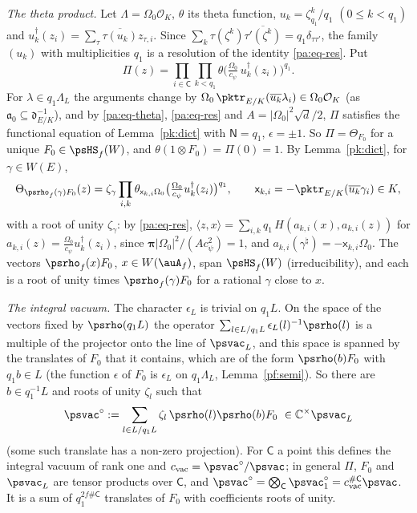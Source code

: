 \documentclass[10pt]{amsart}
\theoremstyle{definition}
\theoremstyle{remark}
\newcommand{\C}{\mathbb C}
\providecommand{\auO}{\mathcal O}
\providecommand{\aubar}[1]{\overline{#1}}
\begin{document}
\emph{The theta product.} Let $\Lambda=\Omega_0\auO_K$, $\theta$ its theta function, $u_k=
\zeta_{q_1}^k/q_1$ $(0\le k<q_1)$ and $u_k^\dagger(z_i)=\sum_\tau\aubar{\tau(u_k)}z_{\tau,i}$. Since
$\sum_k\tau(\zeta^k)\aubar{\tau'(\zeta^k)}=q_1\delta_{\tau\tau'}$, the family $(u_k)$ with
multiplicities $q_1$ is a resolution of the identity \eqref{pa:eq-res}. Put
\begin{equation}\label{pk:eq-product}
\Pi(z)=\prod_{i\in\mathsf C}\prod_{k<q_1}\theta\bigl(\tfrac{\Omega_0}{c_\psi}\,u_k^\dagger(z_i)\bigr)^{q_1}.
\end{equation}
For $\lambda\in q_1\Lambda_L$ the arguments change by $\Omega_0\,\pktr_{E/K}(\aubar{u_k}\lambda_i)\in
\Omega_0\auO_K$ (as $\mathfrak a_0\subseteq\mathfrak d_{E/K}^{-1}$), and by \eqref{pa:eq-theta},
\eqref{pa:eq-res} and $A=|\Omega_0|^2\sqrt d/2$, $\Pi$ satisfies the functional equation of
Lemma~\ref{pk:dict} with $\mathsf N=q_1$, $\epsilon=\pm1$. So $\Pi=\Theta_{F_0}$ for a unique
$F_0\in\psHS_f(W)$, and $\theta(1\otimes F_0)=\Pi(0)=1$. By Lemma~\ref{pk:dict}, for $\gamma\in
W(E)$,
\begin{equation}\label{pk:eq-transl}
\Theta_{\psrho_f(\gamma)F_0}(z)=\zeta_\gamma\prod_{i,k}\theta_{\mathsf x_{k,i}\Omega_0}\bigl(\tfrac
{\Omega_0}{c_\psi}u_k^\dagger(z_i)\bigr)^{q_1},\qquad\mathsf x_{k,i}=-\pktr_{E/K}(\aubar{u_k}\gamma_i)
\in K,
\end{equation}
with a root of unity $\zeta_\gamma$: by \eqref{pa:eq-res}, $\langle z,x\rangle=\sum_{i,k}q_1\,H(a_{k,i}
(x),a_{k,i}(z))$ for $a_{k,i}(z)=\frac{\Omega_0}{c_\psi}u_k^\dagger(z_i)$, since
$\boldsymbol\pi|\Omega_0|^2/(Ac_\psi^2)=1$, and $a_{k,i}(\gamma^\natural)=-\mathsf x_{k,i}\Omega_0$. The vectors $\psrho_f(x)F_0$, $x\in W(\auA_f)$, span
$\psHS_f(W)$ (irreducibility), and each is a root of unity times $\psrho_f(\gamma)F_0$ for a
rational $\gamma$ close to $x$.

\emph{The integral vacuum.} The character $\epsilon_L$ is trivial on $q_1L$. On the space of the vectors fixed by
$\psrho(q_1L)$ the operator $\sum_{l\in L/q_1L}\epsilon_L(l)^{-1}\psrho(l)$ is a multiple of the
projector onto the line of $\psvac_L$, and this space is spanned by the translates of $F_0$ that
it contains, which are of the form $\psrho(b)F_0$ with $q_1b\in L$ (the function $\epsilon$ of
$F_0$ is $\epsilon_L$ on $q_1\Lambda_L$, Lemma~\ref{pf:semi}). So there are $b\in q_1^{-1}L$ and roots of unity $\zeta_l$ such that
\begin{equation}\label{pk:eq-vac}
\psvac^\circ:=\sum_{l\in L/q_1L}\zeta_l\,\psrho(l)\psrho(b)F_0\ \in\C^\times\psvac_L
\end{equation}
(some such translate has a non-zero projection). For
$\mathsf C$ a point this defines the integral vacuum of rank one and $c_{\mathrm{vac}}=\psvac^\circ
/\psvac$; in general $\Pi$, $F_0$ and $\psvac_L$ are tensor products over $\mathsf C$, and
$\psvac^\circ=\bigotimes_{\mathsf C}\psvac^\circ_1=c_{\mathrm{vac}}^{\#\mathsf C}\psvac$. It is a sum
of $q_1^{2f\#\mathsf C}$ translates of $F_0$ with coefficients roots of unity.
\end{document}
